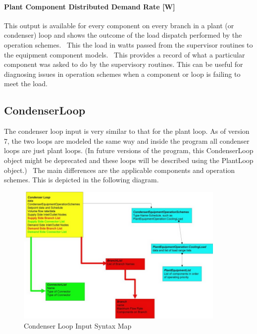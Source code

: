 \paragraph{Plant Component Distributed Demand Rate {[}W{]}}\label{plant-component-distributed-demand-rate-w}

This output is available for every component on every branch in a plant (or condenser) loop and shows the outcome of the load dispatch performed by the operation schemes.~ This the load in watts passed from the supervisor routines to the equipment component models.~ This provides a record of what a particular component was asked to do by the supervisory routines. This can be useful for diagnosing issues in operation schemes when a component or loop is failing to meet the load.

\subsection{CondenserLoop}\label{condenserloop}

The condenser loop input is very similar to that for the plant loop. As of version 7, the two loops are modeled the same way and inside the program all condenser loops are just plant loops. (In future versions of the program, this CondenserLoop object might be deprecated and these loops will be described using the PlantLoop object.)~ The main differences are the applicable components and operation schemes. This is depicted in the following diagram.

\begin{figure}[hbtp] %
\centering
\includegraphics[width=0.9\textwidth, height=0.9\textheight, keepaspectratio=true]{media/image136.png}
\caption{Condenser Loop Input Syntax Map \protect \label{fig:condenser-loop-input-syntax-map}}
\end{figure}

